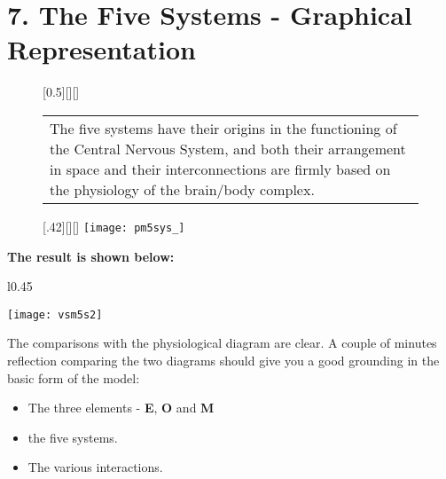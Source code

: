 \section*{7. The Five Systems - Graphical Representation}
\begin{figure}[H]
    \begin{floatrow}
    [0.5\textwidth][][]{}{
    \begin{tabular}{  m{} }
         The five systems have their origins in the functioning of the Central Nervous System, and both their arrangement in space and their interconnections are firmly based on the physiology of the brain/body complex.
    \end{tabular}
}
        [.42\textwidth][][]{}{
            \texttt{[image: pm5sys\_]}
}
    \end{floatrow}
\end{figure}

%


\textbf{The result is shown below:}


\begin{wrapfigure}[15]{l}{0.45\textwidth}
    \begin{center}
        \texttt{[image: vsm5s2]}
    \end{center}
\end{wrapfigure}

The comparisons with the physiological diagram are clear. A couple of minutes reflection comparing the two diagrams should give you a good grounding in the basic form of the model:

\begin{itemize}
	\item The three elements - \textcolor{E}{\textbf{E}}, \textcolor{O}{\textbf{O}} and \textcolor{M}{\textbf{M}}
	\item the five systems.
	\item The various interactions.
\end{itemize}

